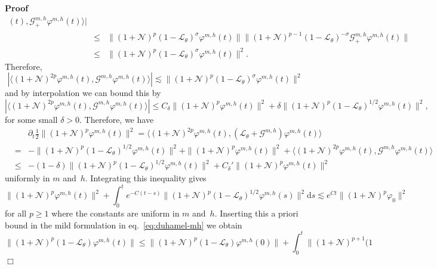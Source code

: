 \documentclass[10pt]{article}
\newcommand{\mathd}{\mathrm{d}}
\newenvironment{proof}{\noindent\textbf{Proof\ }}{\hspace*{\fill}$\Box$\medskip}
\begin{document}
\begin{proof}
\begin{eqnarray*}
    (t), \mathcal{G}^{m, h}_+ \varphi^{m, h} (t) \rangle |\\
    & \leqslant & \| (1 +\mathcal{N})^p (1 -\mathcal{L}_{\theta})^{\sigma}
    \varphi^{m, h} (t) \| \| (1 +\mathcal{N})^{p - 1} (1
    -\mathcal{L}_{\theta})^{- \sigma} \mathcal{G}^{m, h}_+ \varphi^{m, h} (t)
    \|\\
    & \leqslant & \| (1 +\mathcal{N})^p (1 -\mathcal{L}_{\theta})^{\sigma}
    \varphi^{m, h} (t) \|^2 .
  \end{eqnarray*}
  Therefore,
  \[ | \langle (1 +\mathcal{N})^{2 p} \varphi^{m, h} (t), \mathcal{G}^{m, h}
     \varphi^{m, h} (t) \rangle | \lesssim \| (1 +\mathcal{N})^p (1
     -\mathcal{L}_{\theta})^{\sigma} \varphi^{m, h} (t) \|^2 \]
  and by interpolation we can bound this by
  \[ | \langle (1 +\mathcal{N})^{2 p} \varphi^{m, h} (t), \mathcal{G}^{m, h}
     \varphi^{m, h} (t) \rangle | \leqslant C_{\delta} \| (1 +\mathcal{N})^p
     \varphi^{m, h} (t) \|^2 + \delta \| (1 +\mathcal{N})^p (1
     -\mathcal{L}_{\theta})^{1 / 2} \varphi^{m, h} (t) \|^2, \]
  for some small $\delta > 0$. Therefore, we have
  \begin{eqnarray*}
    &  & \partial_t \frac{1}{2} \| (1 +\mathcal{N})^p \varphi^{m, h} (t) \|^2
    = \langle (1 +\mathcal{N})^{2 p} \varphi^{m, h} (t), (\mathcal{L}_{\theta}
    +\mathcal{G}^{m, h}) \varphi^{m, h} (t) \rangle\\
    & = & - \| (1 +\mathcal{N})^p (1 -\mathcal{L}_{\theta})^{1 / 2}
    \varphi^{m, h} (t) \|^2 + \| (1 +\mathcal{N})^p \varphi^{m, h} (t) \|^2 +
    \langle (1 +\mathcal{N})^{2 p} \varphi^{m, h} (t), \mathcal{G}^{m, h}
    \varphi^{m, h} (t) \rangle\\
    & \leqslant & - (1 - \delta) \| (1 +\mathcal{N})^p (1
    -\mathcal{L}_{\theta})^{1 / 2} \varphi^{m, h} (t) \|^2 + C_{\delta}' \| (1
    +\mathcal{N})^p \varphi^{m, h} (t) \|^2
  \end{eqnarray*}
  uniformly in $m$ and~$h$. Integrating this inequality gives
  \[ \| (1 +\mathcal{N})^p \varphi^{m, h} (t) \|^2 + \int_0^t e^{- C (t - s)}
     \| (1 +\mathcal{N})^p (1 -\mathcal{L}_{\theta})^{1 / 2} \varphi^{m, h}
     (s) \|^2 \mathd s \lesssim e^{C t} \| (1 +\mathcal{N})^p \varphi_0 \|^2
  \]
  for all $p \geqslant 1$ where the constants are uniform in $m$ and~$h$.
  Inserting this a priori bound in the mild formulation in
  eq.~{\eqref{eq:duhamel-mh}} we obtain
  \[ \| (1 +\mathcal{N})^p (1 -\mathcal{L}_{\theta}) \varphi^{m, h} (t) \|
     \leqslant \| (1 +\mathcal{N})^p (1 -\mathcal{L}_{\theta}) \varphi^{m, h}
     (0) \| + \int_0^t \| (1 +\mathcal{N})^{p + 1} (1
\]
\end{proof}
\end{document}
